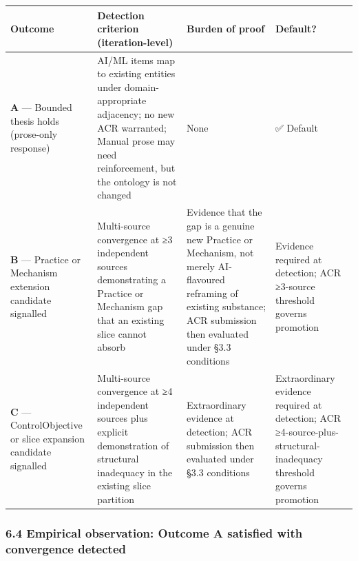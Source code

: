 \documentclass[
]{article}
\begin{document}
\begin{longtable}[]{@{}
  >{\raggedright\arraybackslash}p{}
  >{\raggedright\arraybackslash}p{}
  >{\raggedright\arraybackslash}p{}
  >{\raggedright\arraybackslash}p{}@{}}
\toprule\noalign{}
\begin{minipage}[b]{\linewidth}\raggedright
Outcome
\end{minipage} & \begin{minipage}[b]{\linewidth}\raggedright
Detection criterion (iteration-level)
\end{minipage} & \begin{minipage}[b]{\linewidth}\raggedright
Burden of proof
\end{minipage} & \begin{minipage}[b]{\linewidth}\raggedright
Default?
\end{minipage} \\
\midrule\noalign{}
\endhead
\bottomrule\noalign{}
\endlastfoot
\textbf{A} --- Bounded thesis holds (prose-only response) & AI/ML items
map to existing entities under domain-appropriate adjacency; no new ACR
warranted; Manual prose may need reinforcement, but the ontology is not
changed & None & ✅ Default \\
\textbf{B} --- Practice or Mechanism extension candidate signalled &
Multi-source convergence at ≥3 independent sources demonstrating a
Practice or Mechanism gap that an existing slice cannot absorb &
Evidence that the gap is a genuine new Practice or Mechanism, not merely
AI-flavoured reframing of existing substance; ACR submission then
evaluated under §3.3 conditions & Evidence required at detection; ACR
≥3-source threshold governs promotion \\
\textbf{C} --- ControlObjective or slice expansion candidate signalled &
Multi-source convergence at ≥4 independent sources plus explicit
demonstration of structural inadequacy in the existing slice partition &
Extraordinary evidence at detection; ACR submission then evaluated under
§3.3 conditions & Extraordinary evidence required at detection; ACR
≥4-source-plus-structural-inadequacy threshold governs promotion \\
\end{longtable}

\subsubsection{6.4 Empirical observation: Outcome A satisfied with
convergence
detected}\label{empirical-observation-outcome-a-satisfied-with-convergence-detected}
\end{document}
